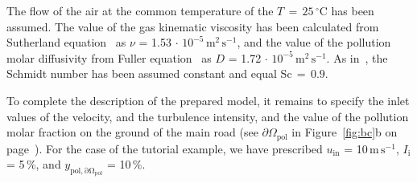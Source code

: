 The flow of the air at the common temperature of the $T\,=\,25\,^\circ$C has been assumed. The value of the gas kinematic viscosity has been calculated from Sutherland equation~\cite{sutherland1893} as $\nu$ = 1.53$\,\cdot\, 10^{-5}\,\mathrm{m^2\,s^{-1}}$, and the value of the pollution molar diffusivity from Fuller equation~\cite{fuller66} as $D$ = 1.72$\,\cdot\, 10^{-5}\,\mathrm{m^2\,s^{-1}}$.  As in~\cite{baik03}, the Schmidt number has been assumed constant and equal Sc$\,=\,0.9$.

To complete the description of the prepared model, it remains to specify the inlet values of the velocity, and the turbulence intensity, and the value of the pollution molar fraction on the ground of the main road (see $\partial\Omega_{\mathrm{pol}}$ in Figure~\ref{fig:bc}b on page~\pageref{fig:bc}). For the case of the tutorial example, we have prescribed $u_{\mathrm{in}}$ = 10\,$\mathrm{m\,s^{-1}}$, $I_\mathrm{i}$ = 5\,\%, and $y_{\mathrm{pol,\partial\Omega_{\mathrm{pol}}}}$ = 10\,\%.